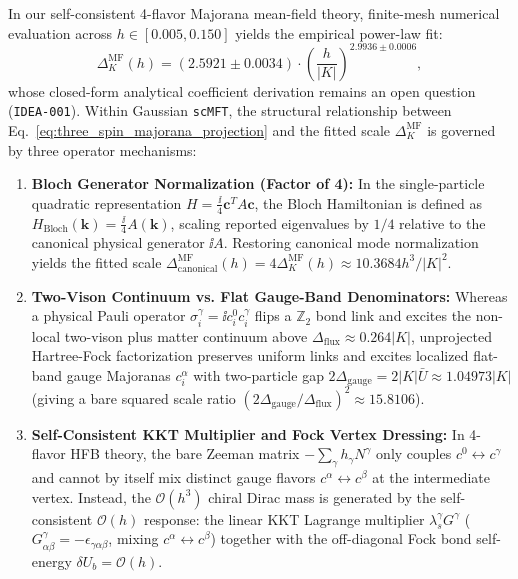 \begin{remark}
In our self-consistent 4-flavor Majorana mean-field theory, finite-mesh numerical evaluation across $h \in [0.005, 0.150]$ yields the empirical power-law fit:
\begin{equation}
\label{eq:mf_gap_numerical_fit}
\Delta_K^{\mathrm{MF}}(h) = (2.5921 \pm 0.0034) \cdot \left(\frac{h}{|K|}\right)^{2.9936 \pm 0.0006},
\end{equation}
whose closed-form analytical coefficient derivation remains an open question (\texttt{IDEA-001}). Within Gaussian \texttt{scMFT}, the structural relationship between Eq.~\eqref{eq:three_spin_majorana_projection} and the fitted scale $\Delta_K^{\mathrm{MF}}$ is governed by three operator mechanisms:
\begin{enumerate}
\item \textbf{Bloch Generator Normalization (Factor of 4):} In the single-particle quadratic representation $H = \frac{\ii}{4}\mathbf{c}^T A \mathbf{c}$, the Bloch Hamiltonian is defined as $H_{\mathrm{Bloch}}(\mathbf{k}) = \frac{\ii}{4} A(\mathbf{k})$, scaling reported eigenvalues by $1/4$ relative to the canonical physical generator $\ii A$. Restoring canonical mode normalization yields the fitted scale $\Delta_{\mathrm{canonical}}^{\mathrm{MF}}(h) = 4 \Delta_K^{\mathrm{MF}}(h) \approx 10.3684 h^3/|K|^2$.
\item \textbf{Two-Vison Continuum vs. Flat Gauge-Band Denominators:} Whereas a physical Pauli operator $\sigma_i^\gamma = \ii c_i^0 c_i^\gamma$ flips a $\mathbb{Z}_2$ bond link and excites the non-local two-vison plus matter continuum above $\Delta_{\mathrm{flux}} \approx 0.264 |K|$, unprojected Hartree-Fock factorization preserves uniform links and excites localized flat-band gauge Majoranas $c_i^\alpha$ with two-particle gap $2\Delta_{\mathrm{gauge}} = 2|K|\bar{U} \approx 1.04973 |K|$ (giving a bare squared scale ratio $(2\Delta_{\mathrm{gauge}}/\Delta_{\mathrm{flux}})^2 \approx 15.8106$).
\item \textbf{Self-Consistent KKT Multiplier and Fock Vertex Dressing:} In 4-flavor HFB theory, the bare Zeeman matrix $-\sum_\gamma h_\gamma N^\gamma$ only couples $c^0 \leftrightarrow c^\gamma$ and cannot by itself mix distinct gauge flavors $c^\alpha \leftrightarrow c^\beta$ at the intermediate vertex. Instead, the $\mathcal{O}(h^3)$ chiral Dirac mass is generated by the self-consistent $\mathcal{O}(h)$ response: the linear KKT Lagrange multiplier $\lambda_s^\gamma G^\gamma$ ($G^\gamma_{\alpha\beta} = -\epsilon_{\gamma\alpha\beta}$, mixing $c^\alpha \leftrightarrow c^\beta$) together with the off-diagonal Fock bond self-energy $\delta U_b = \mathcal{O}(h)$.
\end{enumerate}
\end{remark}

